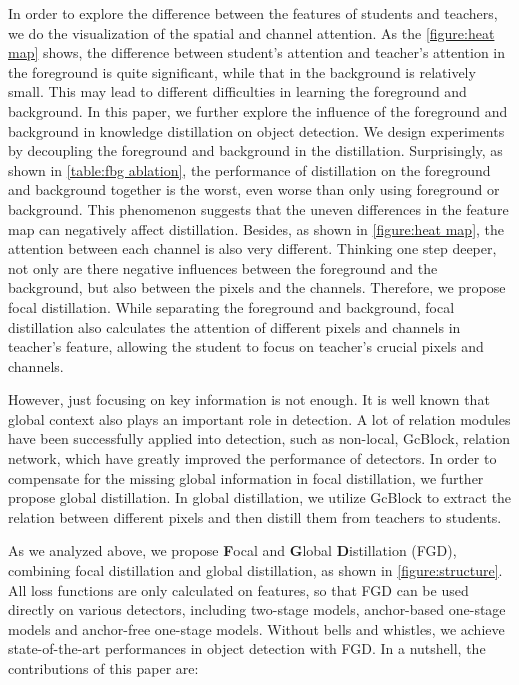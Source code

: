 \documentclass[10pt,twocolumn,letterpaper]{article}
\begin{document}
In order to explore the difference between the features of students and teachers, we do the visualization of the spatial and channel attention. As the \cref{figure:heat map} shows, the difference between student's attention and teacher's attention in the foreground is quite significant, while that in the background is relatively small. This may lead to different difficulties in learning the foreground and background. In this paper, we further explore the influence of the foreground and background in knowledge distillation on object detection. We design experiments by decoupling the foreground and background in the distillation. Surprisingly, as shown in \cref{table:fbg ablation}, the performance of distillation on the foreground and background together is the worst, even worse than only using foreground or background.  This phenomenon suggests that the uneven differences in the feature map can negatively affect distillation. Besides, as shown in \cref{figure:heat map}, the attention between each channel is also very different. Thinking one step deeper, not only are there negative influences between the foreground and the background, but also between the pixels and the channels. Therefore, we propose focal distillation. While separating the foreground and background, focal distillation also calculates the attention of different pixels and channels in teacher's feature, allowing the student to focus on teacher's crucial pixels and channels.

However, just focusing on key information is not enough. It is well known that global context also plays an important role in detection. A lot of relation modules have been successfully applied into detection, such as non-local\cite{wang2018non}, GcBlock\cite{cao2019gcnet}, relation network\cite{hu2018relation}, which have greatly improved the performance of detectors. In order to compensate for the missing global information in focal distillation, we further propose global distillation. In global distillation, we utilize GcBlock to extract the relation between different pixels and then distill them from teachers to students.

As we analyzed above, we propose \textbf{F}ocal and \textbf{G}lobal \textbf{D}istillation (FGD), combining focal distillation and global distillation, as shown in  \cref{figure:structure}. All loss functions are only calculated on features, so that FGD can be used directly on various detectors, including two-stage models, anchor-based one-stage models and anchor-free one-stage models. Without bells and whistles, we achieve state-of-the-art performances in object detection with FGD. In a nutshell, the contributions of this paper are:
\end{document}

